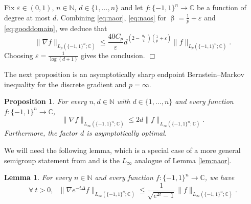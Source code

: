 \documentclass[11pt,reqno]{amsart}
\renewcommand{\leq}{\leqslant}
\renewcommand{\pi}{\uppi}
\newcommand{\e}{\varepsilon}
\newcommand{\1}{\mathbf 1}
\newtheorem{lemma}[theorem]{Lemma}
\newtheorem{proposition}[theorem]{Proposition}
\theoremstyle{remark}
\newcommand{\C}{\mathbb C}
\newcommand{\N}{\mathbb N}
\renewcommand{\theta}{\uptheta}
\renewcommand{\beta}{\upbeta}
\renewcommand{\pi}{\uppi}
\renewcommand{\pi}{\uppi}
\begin{document}
Fix $\e\in(0,1)$, $n\in\N$, $d\in\{1,\ldots,n\}$ and let $f:\{-1,1\}^n\to \C$ be a function of degree at most $d$. Combining \eqref{eq:naor}, \eqref{eq:naos} for $\beta=\frac{1}{p}+\e$ and \eqref{eq:gooddomain}, we deduce that
\begin{equation}
\|\nabla f\|_{L_p(\{-1,1\}^n;\C)} \leq \frac{40 C_p}{\e} d^{(2-\frac{\theta_p}{\pi})(\frac{1}{p}+\e)} \|f\|_{L_p(\{-1,1\}^n;\C)}.
\end{equation}
Choosing $\e=\frac{1}{\log (d+1)}$ gives the conclusion.
\hfill$\Box$

\medskip

The next proposition is an asymptotically sharp endpoint Bernstein--Markov inequality for the discrete gradient and $p=\infty$.

\begin{proposition} \label{prop:gradp=infty}
For every $n,d\in\N$ with $d\in\{1,\ldots,n\}$ and every function $f:\{-1,1\}^n\to\C$,
\begin{equation} \label{eq:gradp=infty}
\|\nabla f\|_{L_\infty(\{-1,1\}^n;\C)} \leq 2d \|f\|_{L_\infty(\{-1,1\}^n;\C)}.
\end{equation}
Furthermore, the factor $d$ is asymptotically optimal.
\end{proposition}

We will need the following lemma, which is a special case of a more general semigroup statement from \cite[Proposition~8.6.1]{BGL14} and is the $L_\infty$ analogue of Lemma \ref{lem:naor}.

\begin{lemma} \label{lem:bgl}
For every $n\in\N$ and every function $f:\{-1,1\}^n\to\C$, we have
\begin{equation}
\forall \ t>0,  \ \ \ \|\nabla e^{-t\Delta} f\|_{L_\infty(\{-1,1\}^n;\C)} \leq \frac{1}{\sqrt{e^{2t}-1}} \|f\|_{L_\infty(\{-1,1\}^n;\C)}.
\end{equation}
\end{lemma}
\end{document}
